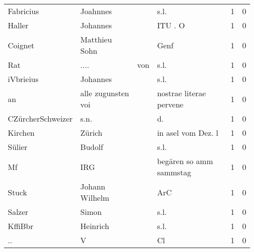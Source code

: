 \begin{center}
\begin{tiny}
\begin{longtabu}{llllrr}
                Fabricius &                           Joahnnes &             &                                        s.l. &          1 &         0 \\
                   Haller &                           Johannes &             &                                     ITU . O &          1 &         0 \\
                  Coignet &                      Matthieu Sohn &             &                                        Genf &          1 &         0 \\
                      Rat &                               .... &         von &                                        s.l. &          1 &         0 \\
                iVbrieius &                           Johannes &             &                                        s.l. &          1 &         0 \\
                       an &                 alle zugunsten voi &             &                     nostrae literae pervene &          1 &         0 \\
        CZürcherSchweizer &                               s.n. &             &                                         d.  &          1 &         0 \\
                  Kirchen &                             Zürich &             &                          in asel vom Dez. l &          1 &         0 \\
                   Sülier &                             Budolf &             &                                        s.l. &          1 &         0 \\
                       Mf &                                IRG &             &                     begären so amm sammstag &          1 &         0 \\
                    Stuck &                     Johann Wilhelm &             &                                         ArC &          1 &         0 \\
                   Salzer &                              Simon &             &                                        s.l. &          1 &         0 \\
                  KffiBbr &                           Heinrich &             &                                        s.l. &          1 &         0 \\
                       .. &                                  V &             &                                          Cl &          1 &         0 \\

\end{longtabu}
\end{tiny}
\end{center}
